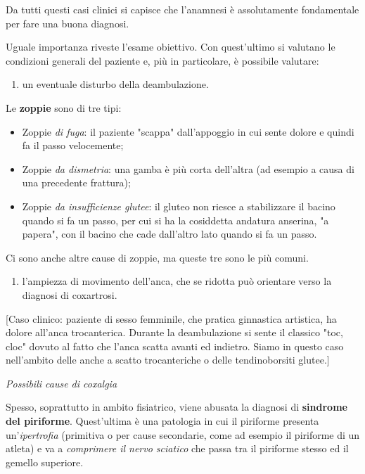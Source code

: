 \documentclass[]{article}
\begin{document}
Da tutti questi casi clinici si capisce che l'anamnesi è assolutamente
fondamentale per fare una buona diagnosi.

Uguale importanza riveste l'esame obiettivo. Con quest'ultimo si
valutano le condizioni generali del paziente e, più in particolare, è
possibile valutare:

\begin{enumerate}
\def\labelenumi{\arabic{enumi}.}
\item
  un eventuale disturbo della deambulazione.
\end{enumerate}

Le \textbf{zoppie} sono di tre tipi:

\begin{itemize}
\item
  Zoppie \emph{di fuga}: il paziente "scappa" dall'appoggio in cui sente
  dolore e quindi fa il passo velocemente;
\item
  Zoppie \emph{da dismetria}: una gamba è più corta dell'altra (ad
  esempio a causa di una precedente frattura);
\item
  Zoppie \emph{da insufficienze glutee}: il gluteo non riesce a
  stabilizzare il bacino quando si fa un passo, per cui si ha la
  cosiddetta andatura anserina, "a papera", con il bacino che cade
  dall'altro lato quando si fa un passo.
\end{itemize}

Ci sono anche altre cause di zoppie, ma queste tre sono le più comuni.

\begin{enumerate}
\def\labelenumi{\arabic{enumi}.}
\item
  l'ampiezza di movimento dell'anca, che se ridotta può orientare verso
  la diagnosi di coxartrosi.
\end{enumerate}

{[}Caso clinico: paziente di sesso femminile, che pratica ginnastica
artistica, ha dolore all'anca trocanterica. Durante la deambulazione si
sente il classico "toc, cloc" dovuto al fatto che l'anca scatta avanti
ed indietro. Siamo in questo caso nell'ambito delle anche a scatto
trocanteriche o delle tendinoborsiti glutee.{]}

\emph{Possibili cause di coxalgia}

Spesso, soprattutto in ambito fisiatrico, viene abusata la diagnosi di
\textbf{sindrome del piriforme}. Quest'ultima è una patologia in cui il
piriforme presenta un'\emph{ipertrofia} (primitiva o per cause
secondarie, come ad esempio il piriforme di un atleta) e va a
\emph{comprimere il nervo sciatico} che passa tra il piriforme stesso ed
il gemello superiore.
\end{document}
